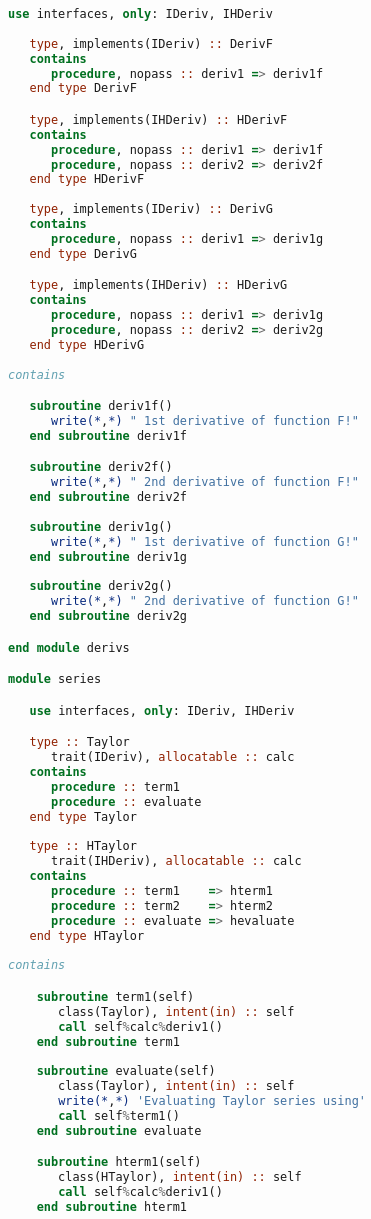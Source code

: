 \documentclass[11pt,oneside]{article}
\begin{document}
\begin{appendices}
\begin{lstlisting}[language=Fortran]
   use interfaces, only: IDeriv, IHDeriv
   
   type, implements(IDeriv) :: DerivF
   contains
      procedure, nopass :: deriv1 => deriv1f
   end type DerivF

   type, implements(IHDeriv) :: HDerivF
   contains
      procedure, nopass :: deriv1 => deriv1f
      procedure, nopass :: deriv2 => deriv2f
   end type HDerivF
   
   type, implements(IDeriv) :: DerivG
   contains
      procedure, nopass :: deriv1 => deriv1g
   end type DerivG

   type, implements(IHDeriv) :: HDerivG
   contains
      procedure, nopass :: deriv1 => deriv1g
      procedure, nopass :: deriv2 => deriv2g
   end type HDerivG
   
contains

   subroutine deriv1f()
      write(*,*) " 1st derivative of function F!"
   end subroutine deriv1f

   subroutine deriv2f()
      write(*,*) " 2nd derivative of function F!"
   end subroutine deriv2f
   
   subroutine deriv1g()
      write(*,*) " 1st derivative of function G!"
   end subroutine deriv1g
   
   subroutine deriv2g()
      write(*,*) " 2nd derivative of function G!"
   end subroutine deriv2g

end module derivs

module series

   use interfaces, only: IDeriv, IHDeriv

   type :: Taylor
      trait(IDeriv), allocatable :: calc
   contains
      procedure :: term1
      procedure :: evaluate
   end type Taylor
   
   type :: HTaylor
      trait(IHDeriv), allocatable :: calc
   contains
      procedure :: term1    => hterm1
      procedure :: term2    => hterm2
      procedure :: evaluate => hevaluate
   end type HTaylor
 
contains

    subroutine term1(self)
       class(Taylor), intent(in) :: self
       call self%calc%deriv1()
    end subroutine term1
    
    subroutine evaluate(self)
       class(Taylor), intent(in) :: self
       write(*,*) 'Evaluating Taylor series using'
       call self%term1()
    end subroutine evaluate

    subroutine hterm1(self)
       class(HTaylor), intent(in) :: self
       call self%calc%deriv1()
    end subroutine hterm1
    

\end{lstlisting}
\end{appendices}
\end{document}
